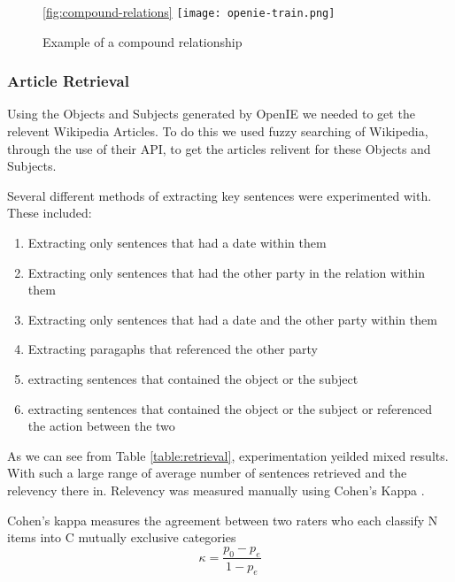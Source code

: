 \documentclass[bsc,frontabs,twoside,singlespacing,parskip,deptreport]{infthesis}     %
\begin{document}
\begin{figure}[h]
  \centering
  \ref{fig:compound-relations}
  \texttt{[image: openie-train.png]}
  \caption{Example of a compound relationship }%
  \end{figure}

\subsubsection{Article Retrieval}
Using the Objects and Subjects generated by OpenIE we needed to get the relevent Wikipedia Articles.
To do this we used fuzzy searching of Wikipedia, through the use of their API, to get the articles relivent
for these Objects and Subjects.

Several different methods of extracting key sentences were experimented with.
These included:
\begin{enumerate}
\item Extracting only sentences that had a date within them
\item Extracting only sentences that had the other party in the relation within them
\item Extracting only sentences that had a date and the other party within them
\item Extracting paragaphs that referenced the other party
  \item extracting sentences that contained the object or the subject 
  \item extracting sentences that contained the object or the subject or referenced the action between the two 
  \end{enumerate}


As we can see from Table \ref{table:retrieval}, experimentation yeilded mixed results.
With such a large range of average number of sentences retrieved and the relevency there in.
Relevency was measured manually using Cohen's Kappa \cite{wood2007understanding}.

Cohen's kappa measures the agreement between two raters who each classify N items into C mutually exclusive categories
\begin{equation}
  \kappa = \frac{p_{0} - p_{e}}{1 - p_{e}}
  \end{equation}
\end{document}
